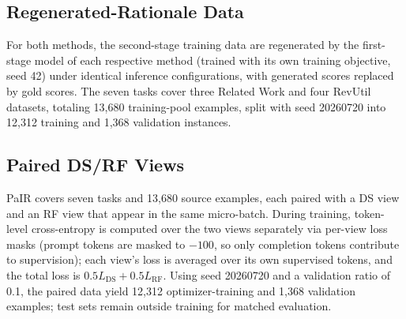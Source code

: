 \subsection{Regenerated-Rationale Data}
\label{app:reason-training-data}

For both methods, the second-stage training data are regenerated by the
first-stage model of each respective method (trained with its own training
objective, seed 42) under identical inference configurations, with generated
scores replaced by gold scores. The seven tasks cover three Related Work and
four RevUtil datasets, totaling 13,680 training-pool examples, split with seed
20260720 into 12,312 training and 1,368 validation instances.

\subsection{Paired DS/RF Views}
\label{tab:constructing-pair-data}

PaIR covers seven tasks and 13,680 source examples, each paired with a DS view
and an RF view that appear in the same micro-batch. During training,
token-level cross-entropy is computed over the two views separately via
per-view loss masks (prompt tokens are masked to \(-100\), so only completion
tokens contribute to supervision); each view's loss is averaged over its own
supervised tokens, and the total loss is
\(0.5L_{\mathrm{DS}} + 0.5L_{\mathrm{RF}}\). Using seed 20260720 and a
validation ratio of 0.1, the paired data yield 12,312 optimizer-training and
1,368 validation examples; test sets remain outside training for matched
evaluation.